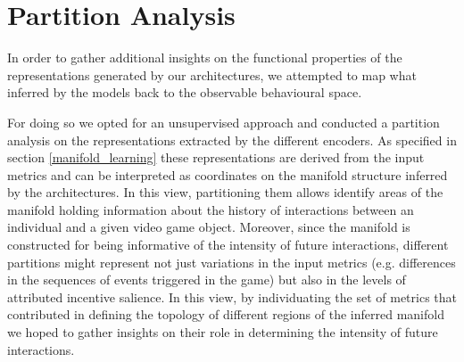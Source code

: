 \section{Partition Analysis}
\label{partition_analysese}
In order to gather additional insights on the functional properties of the representations generated by our architectures, we attempted to map what inferred by the models back to the observable behavioural space. 

For doing so we opted for an unsupervised approach and conducted a partition analysis on the representations extracted by the different encoders. As specified in section \ref{manifold_learning} these representations are derived from the input metrics and  can be interpreted as coordinates on the manifold structure inferred by the architectures. In this view, partitioning them allows identify areas of the manifold holding information about the history of interactions between an individual and a given video game object. Moreover, since the manifold is constructed for being informative of the intensity of future interactions, different partitions might represent not just variations in the input metrics (e.g. differences in the sequences of events triggered in the game) but also in the levels of attributed incentive salience. In this view, by individuating the set of metrics that contributed in defining the topology of different regions of the inferred manifold we hoped to gather insights on their role in determining the intensity of future interactions.

